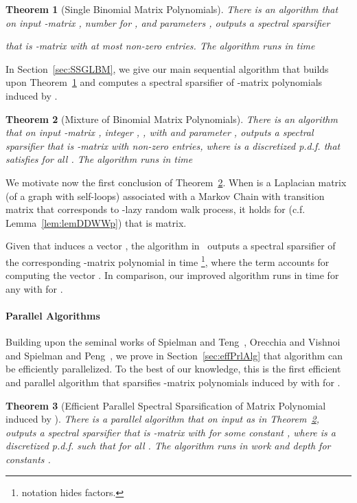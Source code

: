 \documentclass[11pt]{article}
\newcommand{\lemref}[1]{Lemma~\ref{lem:#1}}
\newtheorem{thm}{Theorem}  \newtheorem{fact}[thm]{Fact}
\numberwithin{thm}{section}
\begin{document}
\begin{thm}[Single Binomial Matrix Polynomials]\label{thm_LazySS}
There is an algorithm 
that on input -matrix , number 
for , and parameters , outputs a spectral sparsifier

that is -matrix with at most  non-zero entries. The algorithm  runs in time

\end{thm}


In Section~\ref{sec:SSGLBM}, we give our main sequential algorithm that builds upon Theorem~\ref{thm_LazySS} and computes a spectral sparsifier of -matrix polynomials induced by .

\begin{thm}[Mixture of Binomial Matrix Polynomials]\label{thm_SS_MGL}
There is an algorithm  that on input -matrix , integer , ,   with  and parameter , outputs a spectral sparsifier  that is -matrix with  non-zero entries, where  is a discretized p.d.f. that satisfies  for all . The algorithm runs in time

\end{thm}


We motivate now the first conclusion of Theorem~\ref{thm_SS_MGL}. When  is a Laplacian matrix (of a graph with self-loops) associated with a Markov Chain with transition matrix  that corresponds to -lazy random walk process, it holds for  (c.f. \lemref{lemDDWWp}) that  is  matrix.

Given   that induces a vector , the algorithm in~\cite[Theorem 2]{CCLPT15} outputs a spectral sparsifier of the corresponding -matrix polynomial in time \footnote{ notation hides  factors.}, where the term  accounts for computing the vector . In comparison, our improved algorithm  runs in time  for any  with  for .


\paragraph{Parallel Algorithms}

Building upon the seminal works of Spielman and Teng~\cite{ST11}, Orecchia and Vishnoi~\cite{OV11} and Spielman and Peng~\cite{PS14}, we prove in Section~\ref{sec:effPrlAlg} that algorithm  can be efficiently parallelized. To the best of our knowledge, this is the first efficient and parallel algorithm that sparsifies -matrix polynomials induced by  with  for .


\begin{thm}[Efficient Parallel Spectral Sparsification of Matrix Polynomial induced by ]\label{thm_prl_SS_MGL}
There is a parallel algorithm  that on
input as in Theorem~\ref{thm_SS_MGL}, outputs a spectral sparsifier  that is -matrix with  for some constant , where  is a discretized p.d.f. such that  for all . The algorithm runs in work  and depth  for constants .
\end{thm}
\end{document}
